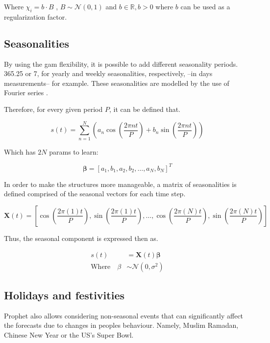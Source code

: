 Where $\chi_i = b \cdot B$ , $B \sim \mathcal{N}(0,1)$ and $b \in \mathbb{R}, b > 0$ where $b$ can be used as a regularization factor.


\subsection{Seasonalities}

By using the \ac{gam} flexibility, it is possible to add different seasonality periods. 365.25 or 7, for yearly and weekly seasonalities, respectively, --in days measurements-- for example. These seasonalities are modelled by the use of Fourier series \cite{harvey_fourier}.

Therefore, for every given period $P$, it can be defined that.

\begin{equation}
	s(t) = \sum_{n=1}^{N}\left( a_n \cos\left( \frac{2 \pi n t}{P}\right)  + b_n \sin\left( \frac{2 \pi n t}{P}\right) \right)
\end{equation}

Which has $2N$ params to learn:

\begin{equation*}
	\bm{\beta} = \left[ a_1, b_1, a_2, b_2, \ldots, a_N, b_N\right]^T
\end{equation*}

In order to make the structures more manageable, a matrix of seasonalities is defined comprised of the seasonal vectors for each time step.

\begin{equation}
	\bm{X}(t) = \left[ \cos\left( \frac{2 \pi (1) t}{P}\right), \sin\left( \frac{2 \pi (1) t}{P}\right), \dots , \cos\left( \frac{2 \pi (N) t}{P}\right), \sin\left( \frac{2 \pi (N) t}{P}\right)  \right]
\end{equation}

Thus, the seasonal component is expressed then as.

\begin{align}
	s(t) &= \bm{X}(t) \bm{\beta} \\
	\text{Where} \quad \beta &\sim \mathcal{N}(0, \sigma^2)
\end{align}


\subsection{Holidays and festivities}

Prophet also allows considering non-seasonal events that can significantly affect the forecasts due to changes in peoples behaviour. Namely, Muslim Ramadan, Chinese New Year or the US's Super Bowl.

